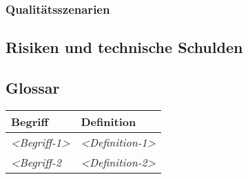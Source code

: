 \subsubsection{Qualitätsszenarien}\label{_qualit_tsszenarien}

\subsection{Risiken und technische Schulden}\label{section-technical-risks}

\subsection{Glossar}\label{section-glossary}

\begin{longtable}[]{@{}ll@{}}
\toprule
\begin{minipage}[b]{0.31\columnwidth}\raggedright\strut
Begriff\strut
\end{minipage} & \begin{minipage}[b]{0.63\columnwidth}\raggedright\strut
Definition\strut
\end{minipage}\tabularnewline
\midrule
\endhead
\begin{minipage}[t]{0.31\columnwidth}\raggedright\strut
\emph{\textless{}Begriff-1\textgreater{}}\strut
\end{minipage} & \begin{minipage}[t]{0.63\columnwidth}\raggedright\strut
\emph{\textless{}Definition-1\textgreater{}}\strut
\end{minipage}\tabularnewline
\begin{minipage}[t]{0.31\columnwidth}\raggedright\strut
\emph{\textless{}Begriff-2}\strut
\end{minipage} & \begin{minipage}[t]{0.63\columnwidth}\raggedright\strut
\emph{\textless{}Definition-2\textgreater{}}\strut
\end{minipage}\tabularnewline
\bottomrule
\end{longtable}
